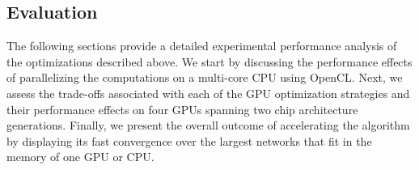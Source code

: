 \subsection{Evaluation}
\label{sec-evaluation}

The following sections provide a detailed experimental performance analysis
of the optimizations described above. We start by discussing the performance
effects of parallelizing the computations
on a multi-core CPU using OpenCL.
%
Next, we assess the trade-offs associated with each of the GPU optimization
strategies and their performance effects on four GPUs spanning two chip
architecture generations.
%
Finally, we present the overall outcome of accelerating the algorithm by
displaying its fast convergence over the largest networks that fit in the
memory of one GPU or CPU.




% 


